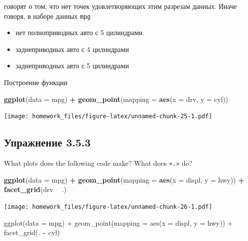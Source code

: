 \documentclass[]{book}
\newenvironment{Shaded}{\begin{snugshade}}{\end{snugshade}}
\newcommand{\KeywordTok}[1]{\textcolor[rgb]{0.13,0.29,0.53}{\textbf{#1}}}
\newcommand{\DataTypeTok}[1]{\textcolor[rgb]{0.13,0.29,0.53}{#1}}
\newcommand{\StringTok}[1]{\textcolor[rgb]{0.31,0.60,0.02}{#1}}
\newcommand{\OperatorTok}[1]{\textcolor[rgb]{0.81,0.36,0.00}{\textbf{#1}}}
\newcommand{\NormalTok}[1]{#1}
\providecommand{\tightlist}{%
  \setlength{\itemsep}{0pt}\setlength{\parskip}{0pt}}
\begin{document}
говорят о том, что нет точек удовлетворяющих этим разрезам данных. Иначе
говоря, в наборе данных \texttt{mpg}

\begin{itemize}
\tightlist
\item
  нет полноприводных авто с 5 цилиндрами
\item
  заднеприводных авто с 4 цилиндрами
\item
  заднеприводных авто с 5 цилиндрами
\end{itemize}

Построение функции

\begin{Shaded}
\begin{Highlighting}[]
\KeywordTok{ggplot}\NormalTok{(}\DataTypeTok{data =}\NormalTok{ mpg) }\OperatorTok{+}\StringTok{ }
\StringTok{  }\KeywordTok{geom_point}\NormalTok{(}\DataTypeTok{mapping =} \KeywordTok{aes}\NormalTok{(}\DataTypeTok{x =}\NormalTok{ drv, }\DataTypeTok{y =}\NormalTok{ cyl))}
\end{Highlighting}
\end{Shaded}

\texttt{[image: homework\_files/figure-latex/unnamed-chunk-25-1.pdf]}

\subsection*{Упражнение 3.5.3}\label{-3.5.3}

What plots does the following code make? What does \texttt{«.»} do?

\begin{Shaded}
\begin{Highlighting}[]
\KeywordTok{ggplot}\NormalTok{(}\DataTypeTok{data =}\NormalTok{ mpg) }\OperatorTok{+}\StringTok{ }
\StringTok{  }\KeywordTok{geom_point}\NormalTok{(}\DataTypeTok{mapping =} \KeywordTok{aes}\NormalTok{(}\DataTypeTok{x =}\NormalTok{ displ, }\DataTypeTok{y =}\NormalTok{ hwy)) }\OperatorTok{+}
\StringTok{  }\KeywordTok{facet_grid}\NormalTok{(drv }\OperatorTok{~}\StringTok{ }\NormalTok{.)}
\end{Highlighting}
\end{Shaded}

\texttt{[image: homework\_files/figure-latex/unnamed-chunk-26-1.pdf]}

ggplot(data = mpg) + geom\_point(mapping = aes(x = displ, y = hwy)) +
facet\_grid(. \textasciitilde{} cyl)


\end{document}
